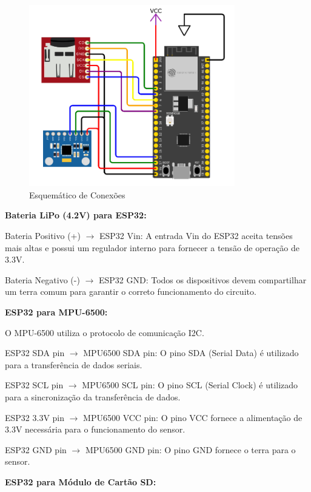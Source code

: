 \begin{figure}[h!]
    \centering
    \includegraphics[width=0.8\textwidth]{figuras/eletronica-pinagem-esquematico.png}

    \caption{Esquemático de Conexões}
    \label{fig_esq_conexoes}
\end{figure}

 \textbf{Bateria LiPo (4.2V) para ESP32:}


Bateria Positivo (+) $\rightarrow$ ESP32 Vin: A entrada Vin do ESP32 aceita tensões mais altas e possui um regulador interno para fornecer a tensão de operação de 3.3V.

Bateria Negativo (-) $\rightarrow$ ESP32 GND: Todos os dispositivos devem compartilhar um terra comum para garantir o correto funcionamento do circuito.

\textbf{ESP32 para MPU-6500:}

O MPU-6500 utiliza o protocolo de comunicação I2C.

ESP32 SDA pin $\rightarrow$ MPU6500 SDA pin: O pino SDA (Serial Data) é utilizado para a transferência de dados seriais.

ESP32 SCL pin $\rightarrow$ MPU6500 SCL pin: O pino SCL (Serial Clock) é utilizado para a sincronização da transferência de dados.

ESP32 3.3V pin $\rightarrow$ MPU6500 VCC pin: O pino VCC fornece a alimentação de 3.3V necessária para o funcionamento do sensor.

ESP32 GND pin $\rightarrow$ MPU6500 GND pin: O pino GND fornece o terra para o sensor.

\textbf{ESP32 para Módulo de Cartão SD:}

